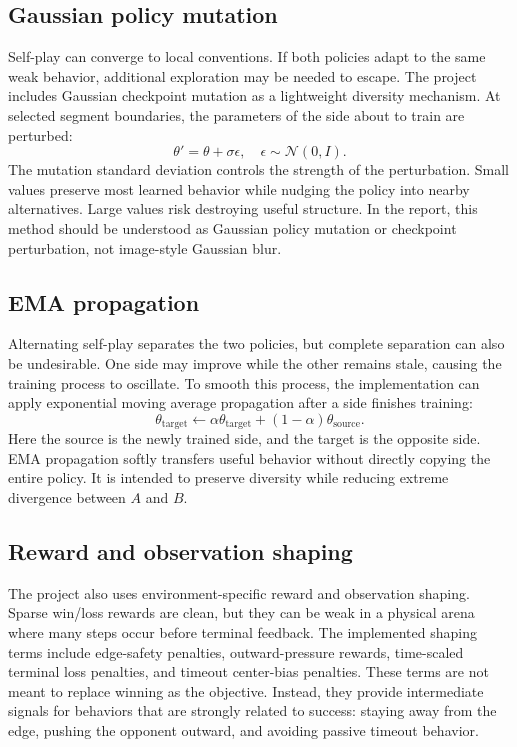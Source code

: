 \documentclass{article}
\begin{document}
\subsection{Gaussian policy mutation}

Self-play can converge to local conventions. If both policies adapt to the same weak behavior, additional exploration may be needed to escape. The project includes Gaussian checkpoint mutation as a lightweight diversity mechanism. At selected segment boundaries, the parameters of the side about to train are perturbed:
\[
    \theta' = \theta + \sigma \epsilon,\quad \epsilon \sim \mathcal{N}(0,I).
\]
The mutation standard deviation controls the strength of the perturbation. Small values preserve most learned behavior while nudging the policy into nearby alternatives. Large values risk destroying useful structure. In the report, this method should be understood as Gaussian policy mutation or checkpoint perturbation, not image-style Gaussian blur.

\subsection{EMA propagation}

Alternating self-play separates the two policies, but complete separation can also be undesirable. One side may improve while the other remains stale, causing the training process to oscillate. To smooth this process, the implementation can apply exponential moving average propagation after a side finishes training:
\[
    \theta_{\mathrm{target}} \leftarrow
    \alpha \theta_{\mathrm{target}} + (1-\alpha)\theta_{\mathrm{source}}.
\]
Here the source is the newly trained side, and the target is the opposite side. EMA propagation softly transfers useful behavior without directly copying the entire policy. It is intended to preserve diversity while reducing extreme divergence between $A$ and $B$.

\subsection{Reward and observation shaping}

The project also uses environment-specific reward and observation shaping. Sparse win/loss rewards are clean, but they can be weak in a physical arena where many steps occur before terminal feedback. The implemented shaping terms include edge-safety penalties, outward-pressure rewards, time-scaled terminal loss penalties, and timeout center-bias penalties. These terms are not meant to replace winning as the objective. Instead, they provide intermediate signals for behaviors that are strongly related to success: staying away from the edge, pushing the opponent outward, and avoiding passive timeout behavior.
\end{document}
